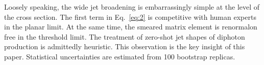 Loosely speaking, the wide jet broadening is embarrassingly simple at
the level of the cross section. The first term in Eq.~\eqref{eq:2} is
competitive with human experts in the planar limit. At the same time,
the smeared matrix element is renormalon free in the threshold limit.
The treatment of zero-shot jet shapes of diphoton production is
admittedly heuristic. This observation is the key insight of this paper.
Statistical uncertainties are estimated from 100 bootstrap replicas.


